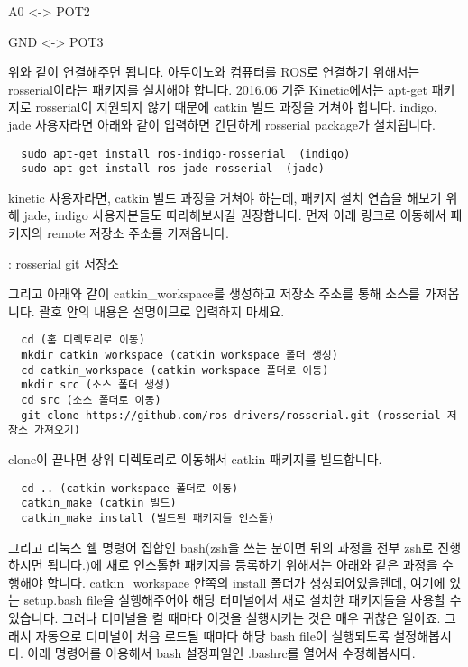 \documentclass[11pt,fleqn]{book} %
\begin{document}
A0 <-> POT2

GND <-> POT3

위와 같이 연결해주면 됩니다. 아두이노와 컴퓨터를 ROS로 연결하기 위해서는 rosserial이라는 패키지를 설치해야 합니다.
2016.06 기준 Kinetic에서는 apt-get 패키지로 rosserial이 지원되지 않기 때문에 catkin 빌드 과정을 거쳐야 합니다.
indigo, jade 사용자라면 아래와 같이 입력하면 간단하게 rosserial package가 설치됩니다.

\begin{verbatim}
  sudo apt-get install ros-indigo-rosserial  (indigo)
  sudo apt-get install ros-jade-rosserial  (jade)
\end{verbatim}

kinetic 사용자라면, catkin 빌드 과정을 거쳐야 하는데, 패키지 설치 연습을 해보기 위해 jade, indigo 사용자분들도 따라해보시길 권장합니다.
먼저 아래 링크로 이동해서 패키지의 remote 저장소 주소를 가져옵니다.

\begin{link}
  : rosserial git 저장소
\end{link}

그리고 아래와 같이 catkin\_workspace를 생성하고 저장소 주소를 통해 소스를 가져옵니다.
괄호 안의 내용은 설명이므로 입력하지 마세요.

\begin{verbatim}
  cd (홈 디렉토리로 이동)
  mkdir catkin_workspace (catkin workspace 폴더 생성)
  cd catkin_workspace (catkin workspace 폴더로 이동)
  mkdir src (소스 폴더 생성)
  cd src (소스 폴더로 이동)
  git clone https://github.com/ros-drivers/rosserial.git (rosserial 저장소 가져오기)
\end{verbatim}

clone이 끝나면 상위 디렉토리로 이동해서 catkin 패키지를 빌드합니다.

\begin{verbatim}
  cd .. (catkin workspace 폴더로 이동)
  catkin_make (catkin 빌드)
  catkin_make install (빌드된 패키지들 인스톨)
\end{verbatim}

그리고 리눅스 쉘 명령어 집합인 bash(zsh을 쓰는 분이면 뒤의 과정을 전부 zsh로 진행하시면 됩니다.)에 새로 인스톨한 패키지를 등록하기 위해서는 아래와 같은 과정을 수행해야 합니다.
catkin\_workspace 안쪽의 install 폴더가 생성되어있을텐데, 여기에 있는 setup.bash file을 실행해주어야 해당 터미널에서 새로 설치한 패키지들을 사용할 수 있습니다.
그러나 터미널을 켤 때마다 이것을 실행시키는 것은 매우 귀찮은 일이죠. 그래서 자동으로 터미널이 처음 로드될 때마다 해당 bash file이 실행되도록 설정해봅시다.
아래 명령어를 이용해서 bash 설정파일인 .bashrc를 열어서 수정해봅시다.
\end{document}
